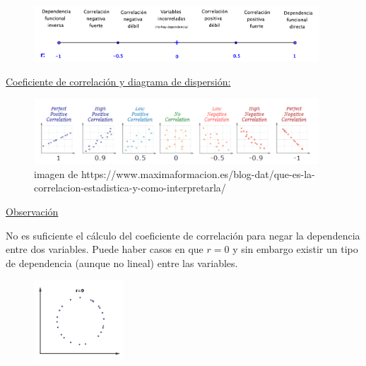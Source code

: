 \begin{definition}
\vspace{5mm} %
	\begin{figure}[H]
			\centering
			\includegraphics[width=0.95\textwidth]{imagenes/imagenes03/T03IM07.png}	
		\end{figure}
		

\vspace{5mm} \underline{Coeficiente de correlación y diagrama de dispersión:}

\vspace{5mm} %
		\begin{figure}[H]
			\centering
			\includegraphics[width=0.95\textwidth]{imagenes/imagenes03/T03IM05.png}
			\caption*{\scriptsize{imagen de https://www.maximaformacion.es/blog-dat/que-es-la-correlacion-estadistica-y-como-interpretarla/}}
	\end{figure}
\end{definition}

\vspace{10mm} %
\begin{multicols}{2}
\underline{Observación} 

No es suficiente el cálculo del coeficiente de correlación para negar la dependencia entre dos variables. Puede haber casos en que $r=0$ y sin embargo existir un tipo de dependencia (aunque no lineal) entre las variables.

	\begin{figure}[H]
			\centering
			\includegraphics[width=0.3\textwidth]{imagenes/imagenes03/T03IM10.png}
	\end{figure}
\end{multicols}

